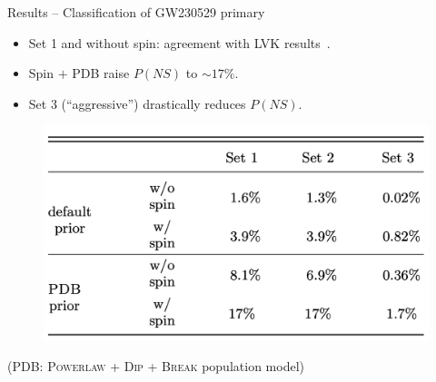 \documentclass[usenames,dvipsnames,t]{beamer}
\begin{document}
\begin{frame}{Results -- Classification of GW230529 primary}

  \def\x{2mm}

  \begin{itemize}
    \vspace{\x}
    \item Set 1 and without spin: agreement with LVK results~\cite{LIGOScientific:2024elc}. 

    \vspace{\x}

    \item Spin $+$ \textsc{PDB} raise $P(NS)$ to $\sim 17\%$.

    \vspace{\x}

    \item Set 3 (``aggressive'') drastically reduces $P(NS)$.
  \end{itemize}

  \begin{figure}
    \centering
    \includegraphics[width=0.7\linewidth]{Figures/extreme_matter_P_ns_table.jpg}
  \end{figure}
  \footnotesize
  \begin{center} 
    (\textsc{PDB}: \textsc{Powerlaw + Dip + Break} population model) 
  \end{center}
  \normalsize


\end{frame}
\end{document}
